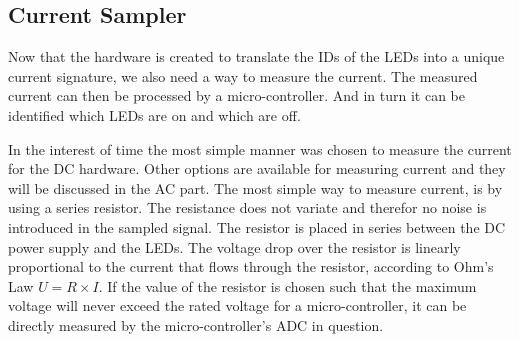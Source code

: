 
 \subsection{Current Sampler}

	Now that the hardware is created to translate the IDs of the LEDs into a unique current signature, we also need a way to measure the current.
	The measured current can then be processed by a micro-controller.
	And in turn it can be identified which LEDs are on and which are off.

	In the interest of time the most simple manner was chosen to measure the current for the DC hardware.
	Other options are available for measuring current and they will be discussed in the AC part.
	The most simple way to measure current, is by using a series resistor.
	The resistance does not variate and therefor no noise is introduced in the sampled signal.
	The resistor is placed in series between the DC power supply and the LEDs.
	The voltage drop over the resistor is linearly proportional to the current that flows through the resistor, according to Ohm's Law $U = R \times I$.
	If the value of the resistor is chosen such that the maximum voltage will never exceed the rated voltage for a micro-controller, it can be directly measured by the micro-controller's ADC in question.